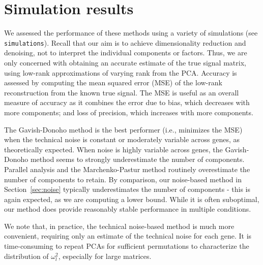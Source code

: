 \documentclass{article}
\begin{document}
\section{Simulation results}
\label{sec:simulations}
We assessed the performance of these methods using a variety of simulations (see \verb!simulations!).
Recall that our aim is to achieve dimensionality reduction and denoising, not to interpret the individual components or factors.
Thus, we are only concerned with obtaining an accurate estimate of the true signal matrix, using low-rank approximations of varying rank from the PCA.
Accuracy is assessed by computing the mean squared error (MSE) of the low-rank reconstruction from the known true signal.
The MSE is useful as an overall measure of accuracy as it combines the error due to bias, which decreases with more components; and loss of precision, which increases with more components.

The Gavish-Donoho method is the best performer (i.e., minimizes the MSE) when the technical noise is constant or moderately variable across genes, as theoretically expected.
When noise is highly variable across genes, the Gavish-Donoho method seems to strongly underestimate the number of components.
Parallel analysis and the Marchenko-Pastur method routinely overestimate the number of components to retain.
By comparison, our noise-based method in Section~\ref{sec:noise} typically underestimates the number of components - this is again expected, as we are computing a lower bound.
While it is often suboptimal, our method does provide reasonably stable performance in multiple conditions.

We note that, in practice, the technical noise-based method is much more convenient, requiring only an estimate of the technical noise for each gene.
It is time-consuming to repeat PCAs for sufficient permutations to characterize the distribution of $\omega^2_l$, especially for large matrices.
\end{document}
